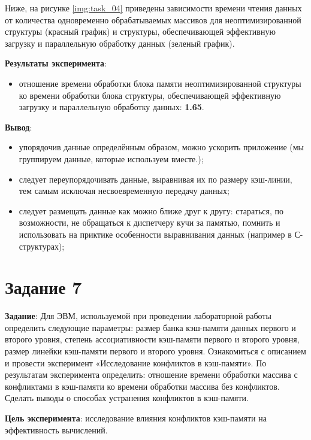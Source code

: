 Ниже, на рисунке \ref{img:task_04} приведены зависимости времени чтения данных от количества одновременно обрабатываемых массивов для неоптимизированной структуры (красный график) и структуры, обеспечивающей эффективную загрузку и параллельную обработку данных (зеленый график).


\textbf{Результаты эксперимента}:
\begin{itemize}
	\item отношение времени обработки блока памяти неоптимизированной структуры ко времени обработки блока структуры, обеспечивающей эффективную загрузку и параллельную обработку данных: \textbf{1.65}.
\end{itemize}

\textbf{Вывод}: 
\begin{itemize}	
	\item упорядочив данные определённым образом, можно ускорить приложение (мы группируем данные, которые используем вместе.);
	\item следует переупорядочивать данные, выравнивая их по размеру кэш-линии, тем самым исключая несвоевременную передачу данных;
	\item следует размещать данные как можно ближе друг к другу: стараться, по возможности, не обращаться к диспетчеру кучи за памятью, помнить и использовать на приктике особенности  выравнивания данных (например в С-структурах);
\end{itemize}

\section*{Задание 7}

\textbf{Задание}: Для ЭВМ, используемой при проведении лабораторной работы определить следующие параметры: размер банка кэш-памяти данных первого и второго уровня, степень ассоциативности кэш-памяти первого и второго уровня, размер линейки кэш-памяти первого и второго уровня. Ознакомиться с описанием и провести эксперимент «Исследование конфликтов в кэш-памяти». По результатам эксперимента определить: отношение времени обработки массива с конфликтами в кэш-памяти ко времени обработки массива без конфликтов. Сделать выводы о способах устранения конфликтов в кэш-памяти. 

\textbf{Цель эксперимента}: исследование влияния конфликтов кэш-памяти на эффективность
вычислений.


